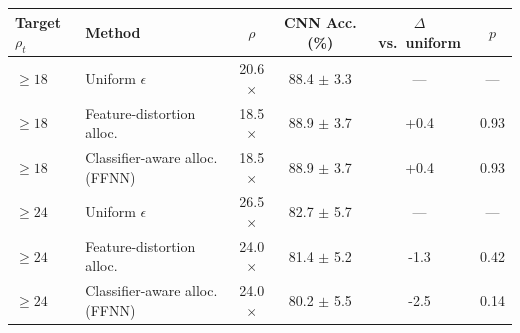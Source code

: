 \begin{tabular}{llcccc}
\toprule
Target $\rho_t$ & Method & $\rho$ & CNN Acc. (\%) & $\Delta$ vs.\ uniform & $p$ \\
\midrule
$\ge18$ & Uniform $\epsilon$ & 20.6$\times$ & 88.4 $\pm$ 3.3 & --- & --- \\
$\ge18$ & Feature-distortion alloc. & 18.5$\times$ & 88.9 $\pm$ 3.7 & +0.4 & 0.93 \\
$\ge18$ & Classifier-aware alloc. (FFNN) & 18.5$\times$ & 88.9 $\pm$ 3.7 & +0.4 & 0.93 \\
$\ge24$ & Uniform $\epsilon$ & 26.5$\times$ & 82.7 $\pm$ 5.7 & --- & --- \\
$\ge24$ & Feature-distortion alloc. & 24.0$\times$ & 81.4 $\pm$ 5.2 & -1.3 & 0.42 \\
$\ge24$ & Classifier-aware alloc. (FFNN) & 24.0$\times$ & 80.2 $\pm$ 5.5 & -2.5 & 0.14 \\
\bottomrule
\end{tabular}
